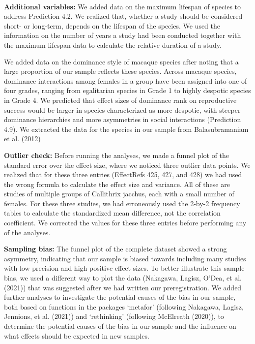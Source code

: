 \documentclass[
]{article}
\begin{document}
~

\textbf{Additional variables:} We added data on the maximum lifespan of
species to address Prediction 4.2. We realized that, whether a study
should be considered short- or long-term, depends on the lifespan of the
species. We used the information on the number of years a study had been
conducted together with the maximum lifespan data to calculate the
relative duration of a study.

We added data on the dominance style of macaque species after noting
that a large proportion of our sample reflects these species. Across
macaque species, dominance interactions among females in a group have
been assigned into one of four grades, ranging from egalitarian species
in Grade 1 to highly despotic species in Grade 4. We predicted that
effect sizes of dominance rank on reproductive success would be larger
in species characterized as more despotic, with steeper dominance
hierarchies and more asymmetries in social interactions (Prediction
4.9). We extracted the data for the species in our sample from
Balasubramaniam et al. (2012)

\textbf{Outlier check:} Before running the analyses, we made a funnel
plot of the standard error over the effect size, where we noticed three
outlier data points. We realized that for these three entries
(EffectRefs 425, 427, and 428) we had used the wrong formula to
calculate the effect size and variance. All of these are studies of
multiple groups of Callithrix jacchus, each with a small number of
females. For these three studies, we had erroneously used the 2-by-2
frequency tables to calculate the standardized mean difference, not the
correlation coefficient. We corrected the values for these three entries
before performing any of the analyses.

\textbf{Sampling bias:} The funnel plot of the complete dataset showed a
strong asymmetry, indicating that our sample is biased towards including
many studies with low precision and high positive effect sizes. To
better illustrate this sample bias, we used a different way to plot the
data (Nakagawa, Lagisz, O'Dea, et al. (2021)) that was suggested after
we had written our preregistration. We added further analyses to
investigate the potential causes of the bias in our sample, both based
on functions in the packages `metafor' (following Nakagawa, Lagisz,
Jennions, et al. (2021)) and `rethinking' (following McElreath (2020)),
to determine the potential causes of the bias in our sample and the
influence on what effects should be expected in new samples.
\end{document}
